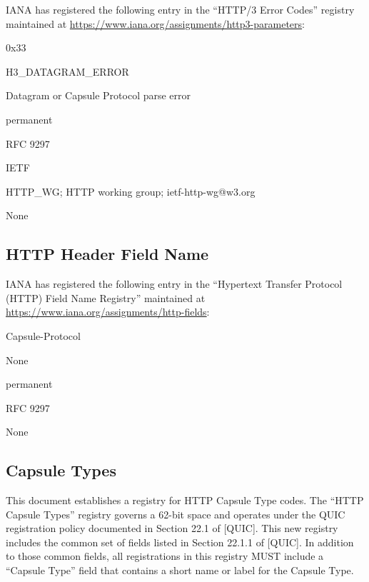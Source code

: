 \documentclass{article}
\begin{document}
IANA has registered the following entry in the ``HTTP/3 Error Codes''
registry maintained at \url{https://www.iana.org/assignments/http3-parameters}:

\begin{description}[style=unboxed, leftmargin=0.5cm]
\item[Value:]  0x33
\item[Name:]  H3\_DATAGRAM\_ERROR
\item[Description:]  Datagram or Capsule Protocol parse error
\item[Status:]  permanent
\item[Reference:]  RFC 9297
\item[Change Controller:]  IETF
\item[Contact:]  HTTP\_WG; HTTP working group; ietf-http-wg@w3.org
\item[Notes:]  None
\end{description}

\subsection{HTTP Header Field Name}

IANA has registered the following entry in the ``Hypertext Transfer
Protocol (HTTP) Field Name Registry'' maintained at
\url{https://www.iana.org/assignments/http-fields}:

\begin{description}[style=unboxed, leftmargin=0.5cm]
\item[Field Name:]  Capsule-Protocol
\item[Template:]  None
\item[Status:]  permanent
\item[Reference:]  RFC 9297
\item[Comments:]  None
\end{description}

\subsection{Capsule Types}

This document establishes a registry for HTTP Capsule Type codes.
The ``HTTP Capsule Types'' registry governs a 62-bit space and operates
under the QUIC registration policy documented in Section 22.1 of
[QUIC].  This new registry includes the common set of fields listed
in Section 22.1.1 of [QUIC].  In addition to those common fields, all
registrations in this registry MUST include a ``Capsule Type'' field
that contains a short name or label for the Capsule Type.
\end{document}
